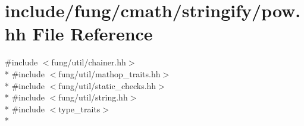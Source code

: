 \hypertarget{stringify_2pow_8hh}{\section{include/fung/cmath/stringify/pow.hh File Reference}
\label{stringify_2pow_8hh}
}
{\ttfamily \#include $<$fung/util/chainer.\-hh$>$}\\*
{\ttfamily \#include $<$fung/util/mathop\-\_\-traits.\-hh$>$}\\*
{\ttfamily \#include $<$fung/util/static\-\_\-checks.\-hh$>$}\\*
{\ttfamily \#include $<$fung/util/string.\-hh$>$}\\*
{\ttfamily \#include $<$type\-\_\-traits$>$}\\*
